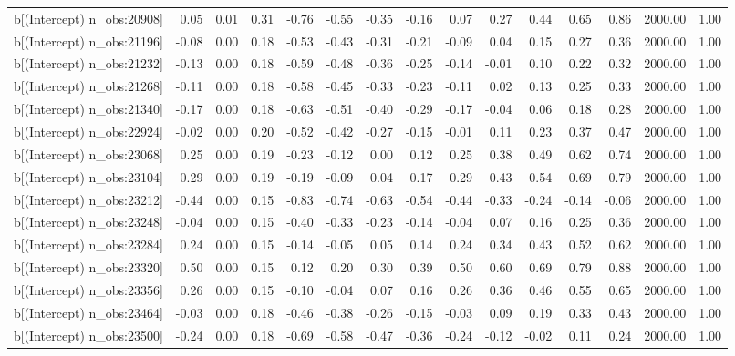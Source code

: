 \begin{table}[ht]
\begin{tabular}{rrrrrrrrrrrrrrr}
  b[(Intercept) n\_obs:20908] & 0.05 & 0.01 & 0.31 & -0.76 & -0.55 & -0.35 & -0.16 & 0.07 & 0.27 & 0.44 & 0.65 & 0.86 & 2000.00 & 1.00 \\ 
  b[(Intercept) n\_obs:21196] & -0.08 & 0.00 & 0.18 & -0.53 & -0.43 & -0.31 & -0.21 & -0.09 & 0.04 & 0.15 & 0.27 & 0.36 & 2000.00 & 1.00 \\ 
  b[(Intercept) n\_obs:21232] & -0.13 & 0.00 & 0.18 & -0.59 & -0.48 & -0.36 & -0.25 & -0.14 & -0.01 & 0.10 & 0.22 & 0.32 & 2000.00 & 1.00 \\ 
  b[(Intercept) n\_obs:21268] & -0.11 & 0.00 & 0.18 & -0.58 & -0.45 & -0.33 & -0.23 & -0.11 & 0.02 & 0.13 & 0.25 & 0.33 & 2000.00 & 1.00 \\ 
  b[(Intercept) n\_obs:21340] & -0.17 & 0.00 & 0.18 & -0.63 & -0.51 & -0.40 & -0.29 & -0.17 & -0.04 & 0.06 & 0.18 & 0.28 & 2000.00 & 1.00 \\ 
  b[(Intercept) n\_obs:22924] & -0.02 & 0.00 & 0.20 & -0.52 & -0.42 & -0.27 & -0.15 & -0.01 & 0.11 & 0.23 & 0.37 & 0.47 & 2000.00 & 1.00 \\ 
  b[(Intercept) n\_obs:23068] & 0.25 & 0.00 & 0.19 & -0.23 & -0.12 & 0.00 & 0.12 & 0.25 & 0.38 & 0.49 & 0.62 & 0.74 & 2000.00 & 1.00 \\ 
  b[(Intercept) n\_obs:23104] & 0.29 & 0.00 & 0.19 & -0.19 & -0.09 & 0.04 & 0.17 & 0.29 & 0.43 & 0.54 & 0.69 & 0.79 & 2000.00 & 1.00 \\ 
  b[(Intercept) n\_obs:23212] & -0.44 & 0.00 & 0.15 & -0.83 & -0.74 & -0.63 & -0.54 & -0.44 & -0.33 & -0.24 & -0.14 & -0.06 & 2000.00 & 1.00 \\ 
  b[(Intercept) n\_obs:23248] & -0.04 & 0.00 & 0.15 & -0.40 & -0.33 & -0.23 & -0.14 & -0.04 & 0.07 & 0.16 & 0.25 & 0.36 & 2000.00 & 1.00 \\ 
  b[(Intercept) n\_obs:23284] & 0.24 & 0.00 & 0.15 & -0.14 & -0.05 & 0.05 & 0.14 & 0.24 & 0.34 & 0.43 & 0.52 & 0.62 & 2000.00 & 1.00 \\ 
  b[(Intercept) n\_obs:23320] & 0.50 & 0.00 & 0.15 & 0.12 & 0.20 & 0.30 & 0.39 & 0.50 & 0.60 & 0.69 & 0.79 & 0.88 & 2000.00 & 1.00 \\ 
  b[(Intercept) n\_obs:23356] & 0.26 & 0.00 & 0.15 & -0.10 & -0.04 & 0.07 & 0.16 & 0.26 & 0.36 & 0.46 & 0.55 & 0.65 & 2000.00 & 1.00 \\ 
  b[(Intercept) n\_obs:23464] & -0.03 & 0.00 & 0.18 & -0.46 & -0.38 & -0.26 & -0.15 & -0.03 & 0.09 & 0.19 & 0.33 & 0.43 & 2000.00 & 1.00 \\ 
  b[(Intercept) n\_obs:23500] & -0.24 & 0.00 & 0.18 & -0.69 & -0.58 & -0.47 & -0.36 & -0.24 & -0.12 & -0.02 & 0.11 & 0.24 & 2000.00 & 1.00 \\ 

\end{tabular}
\end{table}
